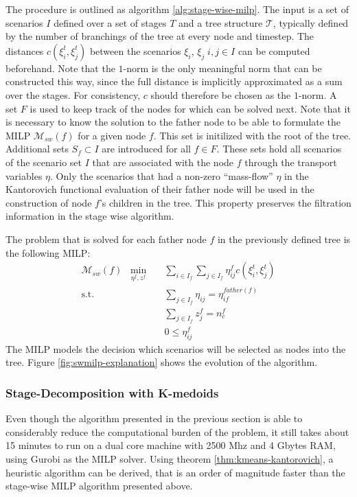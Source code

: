 The procedure is outlined as algorithm \ref{alg:stage-wise-milp}.
The input is a set of scenarios $I$ defined over a set of stages $T$ and a tree structure $\mathcal{T}$, typically defined by the number of branchings of the tree at every node and timestep.
The distances $c(\xi_i^t, \xi_j^t)$ between the scenarios $\xi_i,\,\xi_j\; i,j\in I$ can be computed beforehand.
Note that the $1$-norm is the only meaningful norm that can be constructed this way, since the full distance is implicitly approximated as a sum over the stages.
For consistency, $c$ should therefore be chosen as the $1$-norm.
A set $F$ is used to keep track of the nodes for which can be solved next. Note that it is necessary to know the solution to the father node to be able to formulate the MILP $\mathcal{M}_{sw}(f)$ for a given node $f$. This set is initilized with the root of the tree. Additional sets $S_f\subset I$ are introduced for all $f\in F$. These sets hold all scenarios of the scenario set $I$ that are associated with the node $f$ through the transport variables $\eta$. Only the scenarios that had a non-zero ``mass-flow'' $\eta$ in the Kantorovich functional evaluation of their father node will be used in the construction of node $f$'s children in the tree. This property preserves the filtration information in the stage wise algorithm.

The problem that is solved for each father node $f$ in the previously defined tree is the following MILP:
\begin{eqnarray}
  \label{eq:small-milp-in-alg}
  \mathcal{M}_{sw}(f)\; \; \min_{\eta^f,z^f}&&\sum_{i\in I_f}\sum_{j\in I_f}\eta_{ij}^fc(\xi_i^t,\xi_j^t)\\
  \mathrm{s.t.}&&\sum_{j\in I_f}\eta_{ij} = \eta_{if}^{father(f)}\\
  &&\sum_{j\in I_f}z_j^f = n_c^f\\
  &&0\leq \eta_{ij}^f
\end{eqnarray}
The MILP models the decision which scenarios will be selected as nodes into the tree. Figure \ref{fig:swmilp-explanation} shows the evolution of the algorithm.
\subsubsection{Stage-Decomposition with K-medoids}
Even though the algorithm presented in the previous section is able to considerably reduce the computational burden of the problem, it still takes about 15 minutes to run on a dual core machine with 2500 Mhz and 4 Gbytes RAM, using Gurobi as the MILP solver.
Using theorem \ref{thm:kmeans-kantorovich}, a heuristic algorithm can be derived, that is an order of magnitude faster than the stage-wise MILP algorithm presented above.

